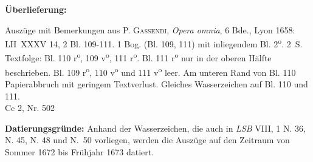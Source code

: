 \begin{ledgroupsized}[r]{120mm}%
\footnotesize%
\pstart%
\noindent\textbf{\"{U}berlieferung:}%
\pend%
\end{ledgroupsized}%
%
\begin{ledgroupsized}[r]{114mm}%
\footnotesize%
\pstart%
\parindent -6mm%
%
Auszüge mit Bemerkungen aus \cite{01029}\textsc{P. Gassendi}, \textit{Opera omnia}, 6 Bde., Lyon 1658:
LH~\mbox{XXXV} 14, 2 Bl. 109-111. 1 Bog. (Bl. 109, 111) %
mit inliegendem Bl. %
2\textsuperscript{o}.
2\, S. Textfolge: Bl. 110 r\textsuperscript{o}, 109 v\textsuperscript{o}, 111 r\textsuperscript{o}.
Bl. 111 r\textsuperscript{o} nur in der oberen H\"{a}lfte beschrieben.
Bl. 109 r\textsuperscript{o}, 110 v\textsuperscript{o} und 111 v\textsuperscript{o} leer.
Am unteren Rand von Bl. 110 Papierabbruch mit geringem Textverlust.
Gleiches Wasserzeichen auf Bl. 110 und 111.\\%
Cc 2, Nr. 502%
\pend%
\end{ledgroupsized}%
\vspace*{5mm}%
\begin{ledgroup}%
\footnotesize%
\pstart%
\noindent%
\footnotesize{\textbf{Datierungsgr\"{u}nde:}
Anhand der Wasserzeichen, die auch in \textit{LSB} VIII, 1 N. 36, N. 45, N. 48 und N.~50 vorliegen, werden die Aus\-züge auf den Zeitraum von Sommer 1672 bis Frühjahr 1673 datiert.
}%
\pend%
\end{ledgroup}%
